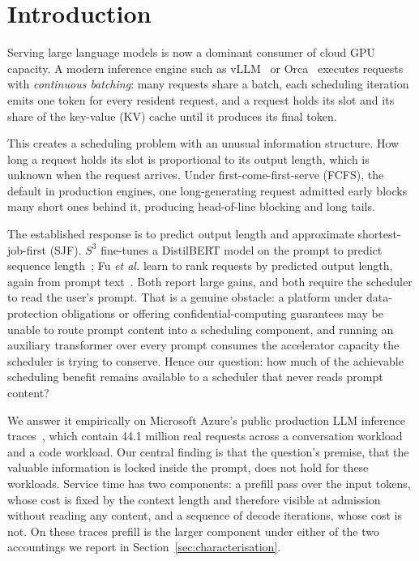 \documentclass[conference,10pt,letterpaper]{IEEEtran}
\begin{document}
\section{Introduction}
\label{sec:intro}

Serving large language models is now a dominant consumer of cloud GPU capacity.
A modern inference engine such as vLLM~\cite{kwon2023pagedattention} or
Orca~\cite{yu2022orca} executes requests with \emph{continuous batching}: many
requests share a batch, each scheduling iteration emits one token for every
resident request, and a request holds its slot and its share of the key-value
(KV) cache until it produces its final token.

This creates a scheduling problem with an unusual information structure. How
long a request holds its slot is proportional to its output length, which is
unknown when the request arrives. Under first-come-first-serve (FCFS), the
default in production engines, one long-generating request admitted early blocks
many short ones behind it, producing head-of-line blocking and long tails.

The established response is to predict output length and approximate
shortest-job-first (SJF). $S^3$ fine-tunes a DistilBERT model on the prompt to
predict sequence length~\cite{jin2023s3}; Fu \emph{et al.} learn to rank
requests by predicted output length, again from prompt text~\cite{fu2024ltr}.
Both report large gains, and both require the scheduler to read the user's
prompt. That is a genuine obstacle: a platform under data-protection
obligations or offering confidential-computing guarantees may be unable to route
prompt content into a scheduling component, and running an auxiliary transformer
over every prompt consumes the accelerator capacity the scheduler is trying to
conserve. Hence our question: how much of the achievable scheduling benefit
remains available to a scheduler that never reads prompt content?

We answer it empirically on Microsoft Azure's public production LLM inference
traces~\cite{azurepublicdataset}, which contain 44.1 million real requests
across a conversation workload and a code workload. Our central finding is that
the question's premise, that the valuable information is locked inside the
prompt, does not hold for these workloads. Service time has two components: a
prefill pass over the input tokens, whose cost is fixed by the context length
and therefore visible at admission without reading any content, and a sequence
of decode iterations, whose cost is not. On these traces prefill is the larger
component under either of the two accountings we report in
Section~\ref{sec:characterisation}.
\end{document}
